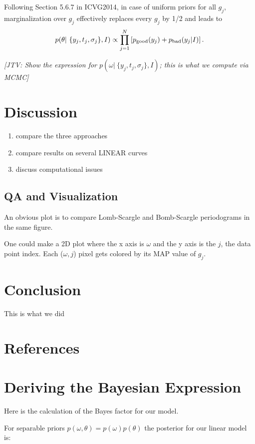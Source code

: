 \documentclass[12pt,pdftex]{article}
\newcommand{\jake}[1]{{\color{blue}\it[JTV: #1]}}
\begin{document}
Following Section 5.6.7 in ICVG2014, in case of uniform priors for all $g_j$, marginalization over
$g_j$ effectively replaces every $g_j$ by 1/2 and leads to 
\begin{equation}
\label{eq:Btheta}
   p(\theta|~\{y_j, t_j, \sigma_j\}, I) \propto \prod_{j=1}^{N} \left[ p_{\rm good}(y_j)  + p_{\rm bad}(y_j|I) \right]. 
\end{equation}

\jake{Show the expression for $p(\omega|~\{y_j, t_j, \sigma_j\}, I)$; this is what we compute via MCMC}

\section{Discussion}
\begin{enumerate}
  \item compare the three approaches
  \item compare results on several LINEAR curves
  \item discuss computational issues  
\end{enumerate}
 

\subsection{QA and Visualization} 

An obvious plot is to compare Lomb-Scargle and Bomb-Scargle periodograms in the same figure. 

One could make a 2D plot where the x axis is $\omega$ and the y axis is the $j$, the data point index.
Each ($\omega, j$) pixel gets colored by its MAP value of $g_j$.


\section{Conclusion}
This is what we did

\section*{References}


\appendix
\section{Deriving the Bayesian Expression}
Here is the calculation of the Bayes factor for our model.

For separable priors $p(\omega,\theta) = p(\omega)p(\theta)$ the posterior for our linear model is:
\end{document}
